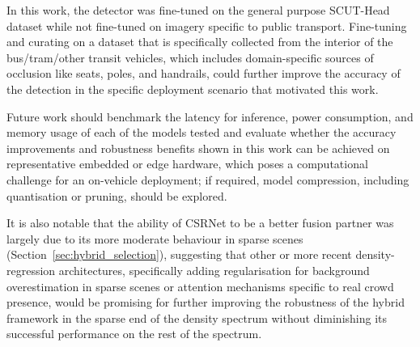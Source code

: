 In this work, the detector was fine-tuned on the general purpose SCUT-Head dataset while not fine-tuned on imagery specific to public transport. Fine-tuning and curating on a dataset that is specifically collected from the interior of the bus/tram/other transit vehicles, which includes domain-specific sources of occlusion like seats, poles, and handrails, could further improve the accuracy of the detection in the specific deployment scenario that motivated this work.

Future work should benchmark the latency for inference, power consumption, and memory usage of each of the models tested and evaluate whether the accuracy improvements and robustness benefits shown in this work can be achieved on representative embedded or edge hardware, which poses a computational challenge for an on-vehicle deployment; if required, model compression, including quantisation or pruning, should be explored.

It is also notable that the ability of CSRNet to be a better fusion partner was largely due to its more moderate behaviour in sparse scenes (Section~\ref{sec:hybrid_selection}), suggesting that other or more recent density-regression architectures, specifically adding regularisation for background overestimation in sparse scenes or attention mechanisms specific to real crowd presence, would be promising for further improving the robustness of the hybrid framework in the sparse end of the density spectrum without diminishing its successful performance on the rest of the spectrum.




